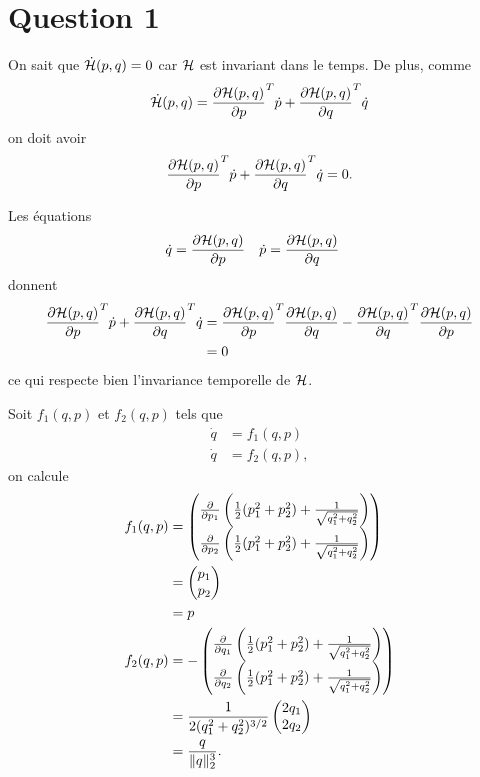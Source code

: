 \section*{Question 1}
On sait que $\dot{\mathcal{H}}(p,q) = 0$ car $\mathcal{H}$ est invariant dans le temps.
De plus, comme
\[
  \dot{\mathcal{H}}(p,q) = \frac{\partial \mathcal{H}(p,q)}{\partial p}^T\dot{p} + \frac{\partial \mathcal{H}(p,q)}{\partial q}^T\dot{q}
\]
on doit avoir
\[
  \frac{\partial \mathcal{H}(p,q)}{\partial p}^T\dot{p} + \frac{\partial \mathcal{H}(p,q)}{\partial q}^T\dot{q} = 0.
\]

Les équations
\begin{align*}
  \dot{q} & = \frac{\partial \mathcal{H}(p,q)}{\partial p} & \dot{p} & = \frac{\partial \mathcal{H}(p,q)}{\partial q}
\end{align*}
donnent
\begin{align*}
  \frac{\partial \mathcal{H}(p,q)}{\partial p}^T\dot{p} + \frac{\partial \mathcal{H}(p,q)}{\partial q}^T\dot{q} & =
  \frac{\partial \mathcal{H}(p,q)}{\partial p}^T\frac{\partial \mathcal{H}(p,q)}{\partial q} - \frac{\partial \mathcal{H}(p,q)}{\partial q}^T\frac{\partial \mathcal{H}(p,q)}{\partial p}\\
  & = 0
\end{align*}
ce qui respecte bien l'invariance temporelle de $\mathcal{H}$.

Soit $f_1(q,p)$ et $f_2(q,p)$ tels que
\begin{align*}
  \dot{q} & = f_1(q,p)\\
  \dot{q} & = f_2(q,p),
\end{align*}
on calcule
\begin{align*}
  f_1(q,p) & =
  \begin{pmatrix}
    \fpart{}{p_1} \left(\frac{1}{2}(p_1^2 + p_2^2) + \frac{1}{\sqrt{q_1^2 + q_2^2}}\right)\\
    \fpart{}{p_2} \left(\frac{1}{2}(p_1^2 + p_2^2) + \frac{1}{\sqrt{q_1^2 + q_2^2}}\right)
  \end{pmatrix}\\
  & =
  \begin{pmatrix}
    p_1\\
    p_2
  \end{pmatrix}\\
  & = p\\
%
  f_2(q,p) & =
  -\begin{pmatrix}
    \fpart{}{q_1} \left(\frac{1}{2}(p_1^2 + p_2^2) + \frac{1}{\sqrt{q_1^2 + q_2^2}}\right)\\
    \fpart{}{q_2} \left(\frac{1}{2}(p_1^2 + p_2^2) + \frac{1}{\sqrt{q_1^2 + q_2^2}}\right)
  \end{pmatrix}\\
  & =
  \frac{1}{2(q_1^2 + q_2^2)^{3/2}}
  \begin{pmatrix}
    2q_1\\
    2q_2
  \end{pmatrix}\\
  & = \frac{q}{\|q\|_2^3}.
\end{align*}


